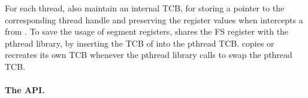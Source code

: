 For each thread, \thelibos{} also maintain an internal TCB,
for storing a pointer to the corresponding thread handle and preserving the register values when \thelibos{} intercepts a \linuxapi{} from \libc{}.
To save the usage of segment registers, \thelibos{} shares the FS register with the pthread library,
by inserting the TCB of \thelibos{} into the pthread TCB.
\thelibos{} copies or recreates its own TCB whenever the pthread library calls  to swap the pthread TCB.



\paragraph{The  API.}




